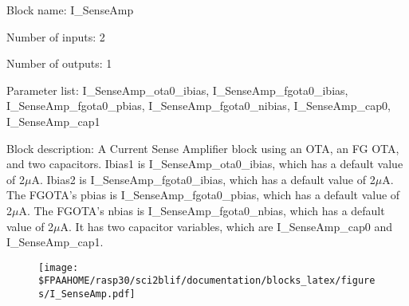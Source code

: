 \pagebreak

Block name: I\_SenseAmp

Number of inputs: 2

Number of outputs: 1

Parameter list: I\_SenseAmp\_ota0\_ibias, I\_SenseAmp\_fgota0\_ibias, I\_SenseAmp\_fgota0\_pbias, I\_SenseAmp\_fgota0\_nibias, I\_SenseAmp\_cap0, I\_SenseAmp\_cap1

Block description: 
A Current Sense Amplifier block using an OTA, an FG OTA, and two capacitors. Ibias1 is I\_SenseAmp\_ota0\_ibias, which has a default value of 2$\mu$A. Ibias2 is I\_SenseAmp\_fgota0\_ibias, which has a default value of 2$\mu$A. The FGOTA's pbias is I\_SenseAmp\_fgota0\_pbias, which has a default value of 2$\mu$A. The FGOTA's nbias is I\_SenseAmp\_fgota0\_nbias, which has a default value of 2$\mu$A. It has two capacitor variables, which are I\_SenseAmp\_cap0 and I\_SenseAmp\_cap1.

\begin{figure}[H]  %
\texttt{[image: \$FPAAHOME/rasp30/sci2blif/documentation/blocks\_latex/figures/I\_SenseAmp.pdf]}
\end{figure}

